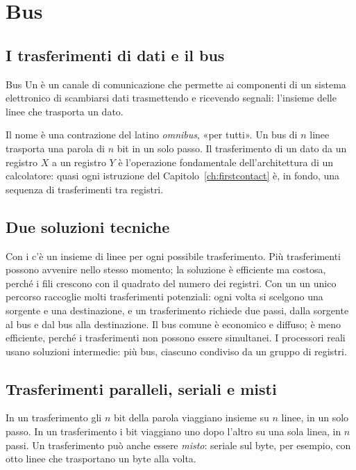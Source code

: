\section{Bus}

\subsection{I trasferimenti di dati e il bus}

\begin{definition}{Bus}
Un  è un canale di comunicazione che permette ai componenti di un
sistema elettronico di scambiarsi dati trasmettendo e ricevendo segnali:
l'insieme delle linee che trasporta un dato.
\end{definition}

Il nome è una contrazione del latino \emph{omnibus}, «per tutti». Un bus di $n$
linee trasporta una parola di $n$ bit in un solo passo. Il trasferimento di un
dato da un registro $X$ a un registro $Y$ è l'operazione fondamentale
dell'architettura di un calcolatore: quasi ogni istruzione del
Capitolo~\ref{ch:firstcontact} è, in fondo, una sequenza di trasferimenti tra
registri.

\subsection{Due soluzioni tecniche}

Con i  c'è un insieme di linee per ogni possibile
trasferimento. Più trasferimenti possono avvenire nello stesso momento; la
soluzione è efficiente ma costosa, perché i fili crescono con il quadrato del
numero dei registri. Con un  un unico percorso raccoglie molti
trasferimenti potenziali: ogni volta si scelgono una sorgente e una
destinazione, e un trasferimento richiede due passi, dalla sorgente al bus e
dal bus alla destinazione. Il bus comune è economico e diffuso; è meno
efficiente, perché i trasferimenti non possono essere simultanei. I processori
reali usano soluzioni intermedie: più bus, ciascuno condiviso da un gruppo di
registri.

\subsection{Trasferimenti paralleli, seriali e misti}

In un trasferimento  gli $n$ bit della parola viaggiano insieme
su $n$ linee, in un solo passo. In un trasferimento  i bit
viaggiano uno dopo l'altro su una sola linea, in $n$ passi. Un trasferimento
può anche essere \emph{misto}: seriale sul byte, per esempio, con otto linee
che trasportano un byte alla volta.

